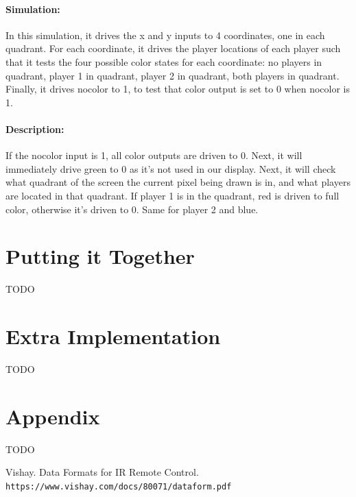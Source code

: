 \documentclass[]{article}
\begin{document}
\paragraph{Simulation:} In this simulation, it drives the x and y inputs to 4 coordinates, one in each quadrant.  For each coordinate, it drives the player locations of each player such that it tests the four possible color states for each coordinate: no players in quadrant, player 1 in quadrant, player 2 in quadrant, both players in quadrant.  Finally, it drives nocolor to 1, to test that color output is set to 0 when nocolor is 1.
\paragraph{Description:} If the nocolor input is 1, all color outputs are driven to 0.  Next, it will immediately drive green to 0 as it's not used in our display.  Next, it will check what quadrant of the screen the current pixel being drawn is in, and what players are located in that quadrant.  If player 1 is in the quadrant, red is driven to full color, otherwise it's driven to 0.  Same for player 2 and blue.

\section{Putting it Together}
TODO

\section{Extra Implementation}
TODO
\section{Appendix}
TODO

\begin{thebibliography}{99}
    Vishay. Data Formats for IR Remote Control. 
    \\\texttt{https://www.vishay.com/docs/80071/dataform.pdf}
\end{thebibliography}
\end{document}
